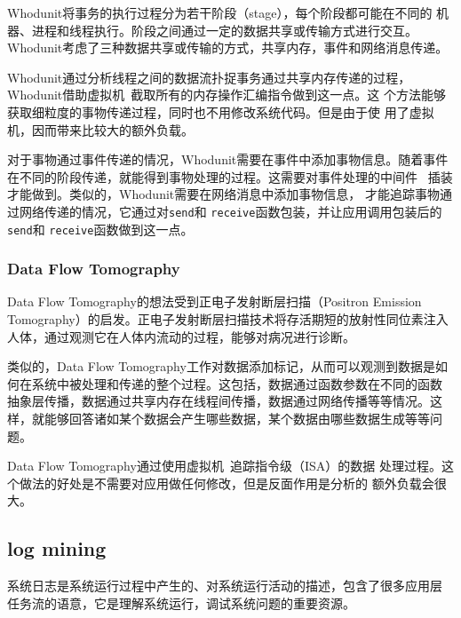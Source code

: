 Whodunit将事务的执行过程分为若干阶段（stage），每个阶段都可能在不同的
机器、进程和线程执行。阶段之间通过一定的数据共享或传输方式进行交互。
Whodunit考虑了三种数据共享或传输的方式，共享内存，事件和网络消息传递。

Whodunit通过分析线程之间的数据流扑捉事务通过共享内存传递的过程，
Whodunit借助虚拟机~\cite{qemu}截取所有的内存操作汇编指令做到这一点。这
个方法能够获取细粒度的事物传递过程，同时也不用修改系统代码。但是由于使
用了虚拟机，因而带来比较大的额外负载。

对于事物通过事件传递的情况，Whodunit需要在事件中添加事物信息。随着事件
在不同的阶段传递，就能得到事物处理的过程。这需要对事件处理的中间件
~\cite{seda}插装才能做到。类似的，Whodunit需要在网络消息中添加事物信息，
才能追踪事物通过网络传递的情况，它通过对\texttt{send}和
\texttt{receive}函数包装，并让应用调用包装后的\texttt{send}和
\texttt{receive}函数做到这一点。

\subsubsection*{Data Flow Tomography}

Data Flow Tomography的想法受到正电子发射断层扫描（Positron Emission
Tomography）的启发。正电子发射断层扫描技术将存活期短的放射性同位素注入
人体，通过观测它在人体内流动的过程，能够对病况进行诊断。

类似的，Data Flow Tomography工作对数据添加标记，从而可以观测到数据是如
何在系统中被处理和传递的整个过程。这包括，数据通过函数参数在不同的函数
抽象层传播，数据通过共享内存在线程间传播，数据通过网络传播等等情况。这
样，就能够回答诸如某个数据会产生哪些数据，某个数据由哪些数据生成等等问
题。

Data Flow Tomography通过使用虚拟机~\cite{qemu}追踪指令级（ISA）的数据
处理过程。这个做法的好处是不需要对应用做任何修改，但是反面作用是分析的
额外负载会很大。


\subsection{log mining}


系统日志是系统运行过程中产生的、对系统运行活动的描述，包含了很多应用层
任务流的语意，它是理解系统运行，调试系统问题的重要资源。

